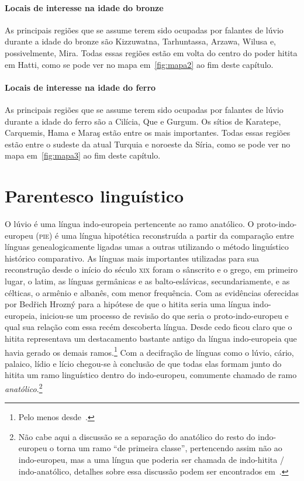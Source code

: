 \paragraph{Locais de interesse na idade do bronze}
As principais regiões que se assume terem sido ocupadas por falantes de lúvio
durante a idade do bronze são Kizzuwatna, Tarhuntassa, Arzawa, Wilusa e,
possivelmente, Mira.
Todas essas regiões estão em volta do centro do poder hitita em Hatti, como se
pode ver no mapa em~\autoref{fig:mapa2} ao fim deste capítulo.

\paragraph{Locais de interesse na idade do ferro}
As principais regiões que se assume terem sido ocupadas por falantes de lúvio
durante a idade do ferro são a Cilícia, Que e Gurgum.
Os sítios de Karatepe, Carquemis, Hama e Maraş estão entre os mais importantes.
Todas essas regiões estão entre o sudeste da atual Turquia e noroeste da Síria,
como se pode ver no mapa em~\autoref{fig:mapa3} ao fim deste capítulo.


\section{Parentesco linguístico}

O lúvio é uma língua indo-europeia pertencente ao ramo anatólico.
O proto\hyp{}indo-europeu (\textsc{pie}) é uma língua hipotética reconstruída a
partir da comparação entre línguas genealogicamente ligadas umas a outras
utilizando o método linguístico histórico comparativo.
As línguas mais importantes utilizadas para sua reconstrução desde o início do
século \textsc{xix} foram o sânscrito e o grego, em primeiro lugar, o latim, as
línguas germânicas e as balto\hyp{}eslávicas, secundariamente, e as célticas,
o armênio e albanês, com menor frequência.
Com as evidências oferecidas por Bedřich Hrozný para a hipótese de que o
hitita seria uma língua indo-europeia, iniciou-se um processo de revisão do que
seria o proto\hyp{}indo-europeu e qual sua relação com essa recém descoberta língua.
Desde cedo ficou claro que o hitita representava um destacamento bastante antigo
da língua indo-europeia que havia gerado os demais ramos.\footnote{Pelo menos
	desde~\citet{Sturtevant1933}.}
Com a decifração de línguas como o lúvio, cário, palaico, lídio e lício chegou-se
à conclusão de que todas elas formam junto do hitita um ramo linguístico dentro do
indo-europeu, comumente chamado de ramo \emph{anatólico}.\footnote{Não cabe aqui
	a discussão se a separação do anatólico do resto do indo-europeu o torna um
	ramo ``de primeira classe'', pertencendo assim não ao indo-europeu, mas a uma
	língua que poderia ser chamada de indo-hitita \slash{} indo\hyp{}anatólico,
	detalhes sobre essa discussão podem ser encontrados em~\citet{Ringue2017}.}

